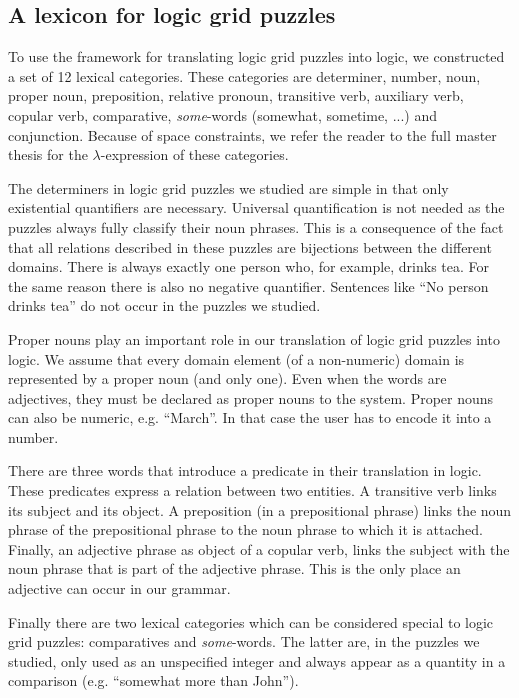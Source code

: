 \subsection{A lexicon for logic grid puzzles}
To use the framework for translating logic grid puzzles into logic, we constructed a set of 12 lexical categories. These categories are determiner, number, noun, proper noun, preposition, relative pronoun, transitive verb, auxiliary verb, copular verb, comparative, \textit{some}-words (somewhat, sometime, ...) and conjunction. Because of space constraints, we refer the reader to the full master thesis for the $\lambda$-expression of these categories.

The determiners in logic grid puzzles we studied are simple in that only existential quantifiers are necessary. Universal quantification is not needed as the puzzles always fully classify their noun phrases. This is a consequence of the fact that all relations described in these puzzles are bijections between the different domains. There is always exactly one person who, for example, drinks tea. For the same reason there is also no negative quantifier. Sentences like ``No person drinks tea'' do not occur in the puzzles we studied.

Proper nouns play an important role in our translation of logic grid puzzles into logic. We assume that every domain element (of a non-numeric) domain is represented by a proper noun (and only one). Even when the words are adjectives, they must be declared as proper nouns to the system.
Proper nouns can also be numeric, e.g. ``March''. In that case the user has to encode it into a number.

There are three words that introduce a predicate in their translation in logic. These predicates express a relation between two entities. A transitive verb links its subject and its object. A preposition (in a prepositional phrase) links the noun phrase of the prepositional phrase to the noun phrase to which it is attached. Finally, an adjective phrase as object of a copular verb, links the subject with the noun phrase that is part of the adjective phrase. This is the only place an adjective can occur in our grammar.



Finally there are two lexical categories which can be considered special to logic grid puzzles: comparatives and \textit{some}-words. The latter are, in the puzzles we studied, only used as an unspecified integer and always appear as a quantity in a comparison (e.g. ``somewhat more than John'').
